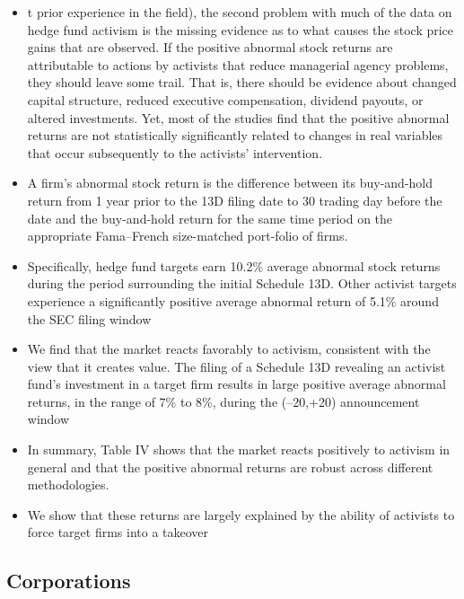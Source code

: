 \documentclass[12pt]{article}
\begin{document}
\begin{itemize}
        \item t prior experience in the field), the second problem with much of the data on hedge fund activism is the missing evidence as to what causes the stock price gains that are observed. If the positive abnormal stock returns are attributable to actions by activists that reduce managerial agency problems, they should leave some trail. That is, there should be evidence about changed capital structure, reduced executive compensation, dividend payouts, or altered investments. Yet, most of the studies find that the positive abnormal returns are not statistically significantly related to changes in real variables that occur subsequently to the activists’ intervention. \citep{CoffeeJr.2014}

        \item A firm’s abnormal stock return is the difference between its buy-and-hold return from 1 year prior to the 13D filing date to 30 trading day before the date and the buy-and-hold return for the same time period on the appropriate Fama–French size-matched port-folio of firms. \citep{Klein2009}

        \item Specifically, hedge fund targets earn 10.2\% average abnormal stock returns during the period surrounding the initial Schedule 13D. Other activist targets experience a significantly positive average abnormal return of 5.1\% around the SEC filing window \citep{Klein2009}

        \item We find that the market reacts favorably to activism, consistent with the view that it creates value. The filing of a Schedule 13D revealing an activist fund’s investment in a target firm results in large positive average abnormal returns, in the range of 7\% to 8\%, during the (–20,+20) announcement window \citep{Brav2008}

        \item In summary, Table IV shows that the market reacts positively to activism in general and that the positive abnormal returns are robust across different methodologies. \citep{Klein2009}

        \item We show that these returns are largely explained by the ability of activists to force target firms into a takeover \citep{Greenwood2009}

    \end{itemize}

\subsection{Corporations}
\end{document}
